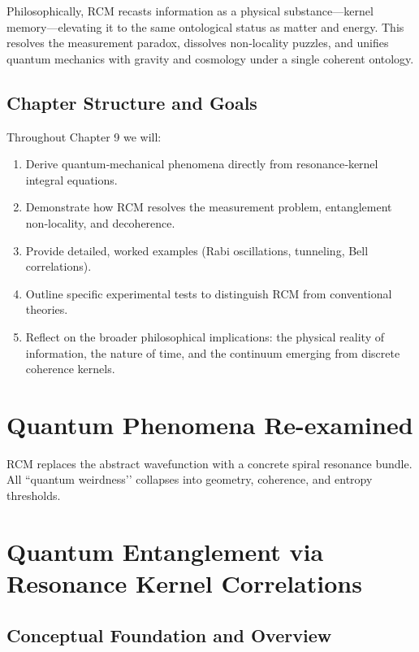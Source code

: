 Philosophically, RCM recasts information as a physical substance—kernel memory—elevating it to the same ontological status as matter and energy.  This resolves the measurement paradox, dissolves non‐locality puzzles, and unifies quantum mechanics with gravity and cosmology under a single coherent ontology.

\subsection{Chapter Structure and Goals}

Throughout Chapter 9 we will:

\begin{enumerate}
  \item Derive quantum‐mechanical phenomena directly from resonance‐kernel integral equations.  
  \item Demonstrate how RCM resolves the measurement problem, entanglement non‐locality, and decoherence.  
  \item Provide detailed, worked examples (Rabi oscillations, tunneling, Bell correlations).  
  \item Outline specific experimental tests to distinguish RCM from conventional theories.  
  \item Reflect on the broader philosophical implications: the physical reality of information, the nature of time, and the continuum emerging from discrete coherence kernels.
\end{enumerate}

\section{Quantum Phenomena Re-examined}

\begin{concept}
RCM replaces the abstract wavefunction with a concrete spiral resonance
bundle.  All “quantum weirdness’’ collapses into geometry, coherence, and
entropy thresholds.
\end{concept}

\section{Quantum Entanglement via Resonance Kernel Correlations}

\subsection{Conceptual Foundation and Overview}

